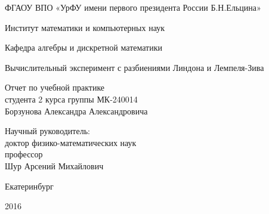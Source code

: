 \begin{center}
    \large ФГАОУ ВПО «УрФУ имени первого президента России Б.Н.Ельцина»
 
    Институт математики и компьютерных наук
    \vspace{0.5cm}

    Кафедра алгебры и дискретной математики
    \vspace{5.0cm}

    {\LARGE Вычислительный эксперимент с разбиениями Линдона и Лемпеля-Зива}
    \vspace{5.0cm}

    \begin{flushright}
    \hfill\parbox{9cm}{
        Отчет по учебной практике \\
        студента 2 курса группы МК-240014 \\
        Борзунова Александра Александровича
        \vspace{2cm}

        Научный руководитель: \\
        доктор физико-математических наук \\
        профессор \\
        Шур Арсений Михайлович
    }

    \end{flushright}
    \vspace{\fill}
    Екатеринбург

    2016
\end{center}
\thispagestyle{empty}
\newpage
